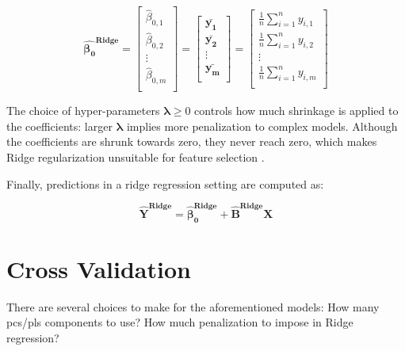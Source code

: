 \begin{equation}
	\label{eqn:ridge-betazero}
		\boldsymbol{\hat{\beta_0}^\text{Ridge}} =
		\begin{bmatrix}
			
			\hat{\beta}_{0,1}\\
			\hat{\beta}_{0,2}\\
			\vdots \\
			\hat{\beta}_{0,m}\\
		\end{bmatrix}
	=
	\begin{bmatrix}
		
		\mathbf{\bar{y_1}}\\
		\mathbf{\bar{y_2}}\\
		\vdots \\
		\mathbf{\bar{y_m}}\\
	\end{bmatrix}
	=
	\begin{bmatrix}
		
		\frac{1}{n}\sum_{i = 1}^{n} y_{i,1}\\
		\frac{1}{n}\sum_{i = 1}^{n} y_{i,2}\\
		\vdots \\
		\frac{1}{n}\sum_{i = 1}^{n} y_{i,m}\\
	\end{bmatrix} 
\end{equation}

The choice of hyper-parameters $\boldsymbol{\lambda} \geq 0$ controls how much shrinkage is applied to the coefficients: larger $\boldsymbol{\lambda}$ implies more penalization to complex models. Although the coefficients are shrunk towards zero, they never reach zero, which makes Ridge regularization unsuitable for feature selection \parencite{friedman2001}.
 
 Finally, predictions in a ridge regression setting are computed as:
 
 \begin{equation}
 	\label{eqn:ridge-yhat}
 	\mathbf{\hat{Y}^\text{Ridge}} = \boldsymbol{\hat{\beta}_0^\text{Ridge}} + \mathbf{\hat{B}^\text{Ridge}} \mathbf{X}
 \end{equation}

\section{Cross Validation}
\label{sec:crossval}

There are several choices to make for the aforementioned models: How many \acrshort{pc}s/\acrshort{pls} components to use? How much penalization to impose in Ridge regression? 

